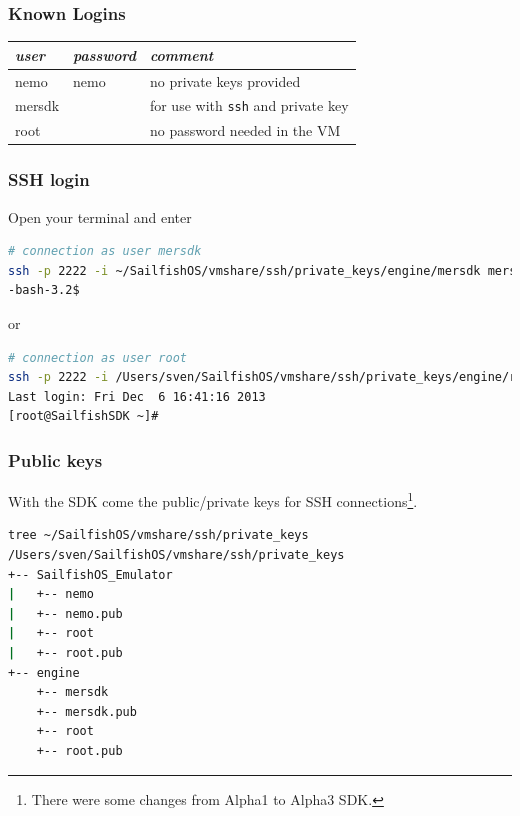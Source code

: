 \subsubsection{Known Logins}\label{subsubsec:mersdklogins}
%
\begin{tabular}{lll}
  \emph{user} & \emph{password} & \emph{comment} \\
  \hline 
  nemo & nemo & no private keys provided \\
  mersdk &  & for use with \verb,ssh, and private key \\
  root &  & no password needed in the VM \\
\end{tabular}
%
%
\subsubsection{SSH login}\label{subsubsec:mersdk:sshlogin}
%
Open your terminal and enter
%
\begin{lstlisting}[language=bash]
# connection as user mersdk
ssh -p 2222 -i ~/SailfishOS/vmshare/ssh/private_keys/engine/mersdk mersdk@localhost
-bash-3.2$ 
\end{lstlisting}
%
or
%
\begin{lstlisting}[language=bash]
# connection as user root
ssh -p 2222 -i /Users/sven/SailfishOS/vmshare/ssh/private_keys/engine/root root@localhost
Last login: Fri Dec  6 16:41:16 2013
[root@SailfishSDK ~]# 
\end{lstlisting}
%
%
\subsubsection{Public keys}
%
With the SDK come the public/private keys for SSH connections\footnote{There were some changes from Alpha1 to Alpha3 SDK.}.
%
\begin{lstlisting}[language=bash]
tree ~/SailfishOS/vmshare/ssh/private_keys 
/Users/sven/SailfishOS/vmshare/ssh/private_keys
+-- SailfishOS_Emulator
|   +-- nemo
|   +-- nemo.pub
|   +-- root
|   +-- root.pub
+-- engine
    +-- mersdk
    +-- mersdk.pub
    +-- root
    +-- root.pub
\end{lstlisting}
%